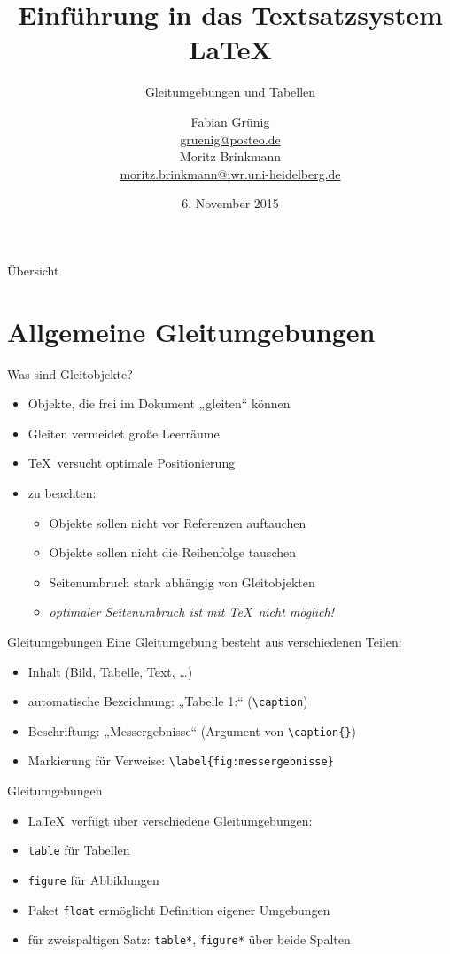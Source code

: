 \documentclass{beamer}
\title{Einführung in das Textsatzsystem \LaTeX{}}
\subtitle{Gleitumgebungen und Tabellen}
\author[Mo]{Fabian Grünig\\\url{gruenig@posteo.de}\\[1ex]Moritz Brinkmann\\\url{moritz.brinkmann@iwr.uni-heidelberg.de}}
\date{6. November 2015}
\begin{document}
\frame{\titlepage}

\begin{frame}{Übersicht}
	\tableofcontents
\end{frame}

\section[Gleitumgebungen]{Allgemeine Gleitumgebungen}
\begin{frame}{Was sind Gleitobjekte?}
\begin{itemize}
\item Objekte, die frei im Dokument „gleiten“ können
\item Gleiten vermeidet große Leerräume
\item \TeX\ versucht optimale Positionierung
\item zu beachten:
\begin{itemize}
\item Objekte sollen nicht vor Referenzen auftauchen
\item Objekte sollen nicht die Reihenfolge tauschen
\item Seitenumbruch stark abhängig von Gleitobjekten
\item \emph{optimaler Seitenumbruch ist mit \TeX\ nicht möglich!}
\end{itemize}
\end{itemize}
\end{frame}

\begin{frame}[fragile]{Gleitumgebungen}
Eine Gleitumgebung besteht aus verschiedenen Teilen:
\begin{itemize}
\item Inhalt (Bild, Tabelle, Text, \dots)
\item automatische Bezeichnung: „Tabelle 1:“ (\verb|\caption|)
\item Beschriftung: „Messergebnisse“ (Argument von \verb|\caption{}|)
\item Markierung für Verweise: \verb|\label{fig:messergebnisse}|
\end{itemize}
\end{frame}

\begin{frame}[fragile]{Gleitumgebungen}
\begin{itemize}
\item \LaTeX\ verfügt über verschiedene Gleitumgebungen:
\item \verb|table| für Tabellen
\item \verb|figure| für Abbildungen
\item Paket \verb|float| ermöglicht Definition eigener Umgebungen
\item für zweispaltigen Satz: \verb|table*|, \verb|figure*| über beide Spalten
\end{itemize}
\end{frame}
\end{document}
